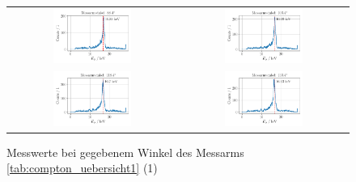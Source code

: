 \documentclass[ngerman]{scrartcl}
\begin{document}
\begin{figure}[H]
\begin{tabular}{cc}
        \includegraphics[width=0.48\textwidth]{../plots/energie_spektren_5.pdf} &
        \includegraphics[width=0.48\textwidth]{../plots/energie_spektren_6.pdf}   \\
        \includegraphics[width=0.48\textwidth]{../plots/energie_spektren_7.pdf} &
        \includegraphics[width=0.48\textwidth]{../plots/energie_spektren_8.pdf}   \\
    \end{tabular}
    \caption{Messwerte bei gegebenem Winkel des Messarms \autoref{tab:compton_uebersicht1} (1)} %
    \label{fig:compton_uebersicht1}
\end{figure}
%
\end{document}
